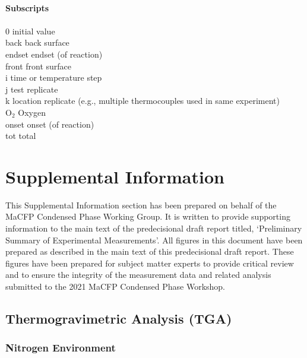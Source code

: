 \begin{tabbing}
\hspace{0.1in}            		\> \\
{\bf Subscripts}      	    	\> \\
\hspace{0.1in}            		\> \\
0     	                    			\> initial value \\
back         				\> back surface\\
endset         				\> endset (of reaction)\\
front         				\> front surface\\
i                          			\> time or temperature step\\
j                          			\> test replicate\\
k	                          		\> location replicate (e.g., multiple thermocouples used in same experiment)\\
O$_2$                         		\> Oxygen \\
onset                  			\> onset (of reaction)\\
tot                  				\> total\\
\end{tabbing}




\chapter{Supplemental Information}
\label{SI}
This Supplemental Information section has been prepared on behalf of the MaCFP Condensed Phase Working Group. It is written to provide supporting information to the main text of the predecisional draft report titled, `Preliminary Summary of Experimental Measurements'. All figures in this document have been prepared as described in the main text of this predecisional draft report. These figures have been prepared for subject matter experts to provide critical review and to ensure the integrity of the measurement data and related analysis submitted to the 2021 MaCFP Condensed Phase Workshop. 

\newpage
\section{Thermogravimetric Analysis (TGA)}
\subsection{Nitrogen Environment}
\label{TGA_N2}
